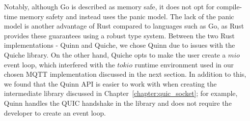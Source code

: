 Notably, although Go is described as memory safe, it does not opt for compile-time memory safety and instead uses the panic model.
The lack of the panic model is another advantage of Rust compared to languages such as Go, as Rust provides these guarantees using a robust type system.
Between the two Rust implementations - Quinn and Quiche, we chose Quinn due to issues with the Quiche library.
On the other hand, Quiche opts to make the user create a $mio$ event loop, which interfered with the $tokio$ runtime environment used in our chosen MQTT implementation discussed in the next section.
In addition to this, we found that the Quinn API is easier to work with when creating the intermediate library discussed in Chapter~\ref{chapter:quic_socket}; for example, Quinn handles the QUIC handshake in the library and does not require the developer to create an event loop.
